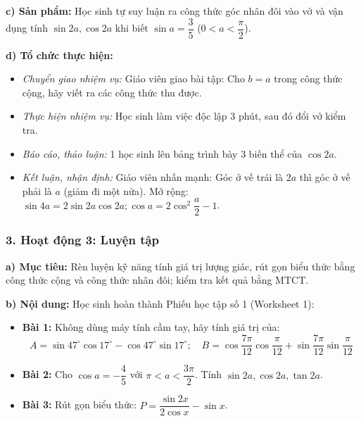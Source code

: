 \documentclass[12pt, a4paper]{article}
\begin{document}
\textbf{c) Sản phẩm:} Học sinh tự suy luận ra công thức góc nhân đôi vào vở và vận dụng tính $\sin 2a, \cos 2a$ khi biết $\sin a = \dfrac{3}{5}$ ($0 < a < \dfrac{\pi}{2}$).

\textbf{d) Tổ chức thực hiện:}
\begin{itemize}[leftmargin=0.6cm]
    \item \textit{Chuyển giao nhiệm vụ:} Giáo viên giao bài tập: Cho $b = a$ trong công thức cộng, hãy viết ra các công thức thu được.
    \item \textit{Thực hiện nhiệm vụ:} Học sinh làm việc độc lập 3 phút, sau đó đổi vở kiểm tra.
    \item \textit{Báo cáo, thảo luận:} 1 học sinh lên bảng trình bày 3 biến thể của $\cos 2a$.
    \item \textit{Kết luận, nhận định:} Giáo viên nhấn mạnh: Góc ở vế trái là $2a$ thì góc ở vế phải là $a$ (giảm đi một nửa). Mở rộng: $\sin 4a = 2\sin 2a \cos 2a; \cos a = 2\cos^2\dfrac{a}{2} - 1$.
\end{itemize}

\subsubsection*{3. Hoạt động 3: Luyện tập}
\textbf{a) Mục tiêu:} Rèn luyện kỹ năng tính giá trị lượng giác, rút gọn biểu thức bằng công thức cộng và công thức nhân đôi; kiểm tra kết quả bằng MTCT.

\textbf{b) Nội dung:} Học sinh hoàn thành Phiếu học tập số 1 (Worksheet 1):
\begin{itemize}[leftmargin=0.6cm]
    \item \textbf{Bài 1:} Không dùng máy tính cầm tay, hãy tính giá trị của:
    $$A = \sin 47^\circ \cos 17^\circ - \cos 47^\circ \sin 17^\circ; \quad B = \cos\dfrac{7\pi}{12} \cos\dfrac{\pi}{12} + \sin\dfrac{7\pi}{12} \sin\dfrac{\pi}{12}$$
    \item \textbf{Bài 2:} Cho $\cos a = -\dfrac{4}{5}$ với $\pi < a < \dfrac{3\pi}{2}$. Tính $\sin 2a, \cos 2a, \tan 2a$.
    \item \textbf{Bài 3:} Rút gọn biểu thức: $P = \dfrac{\sin 2x}{2\cos x} - \sin x$.
\end{itemize}
\end{document}
